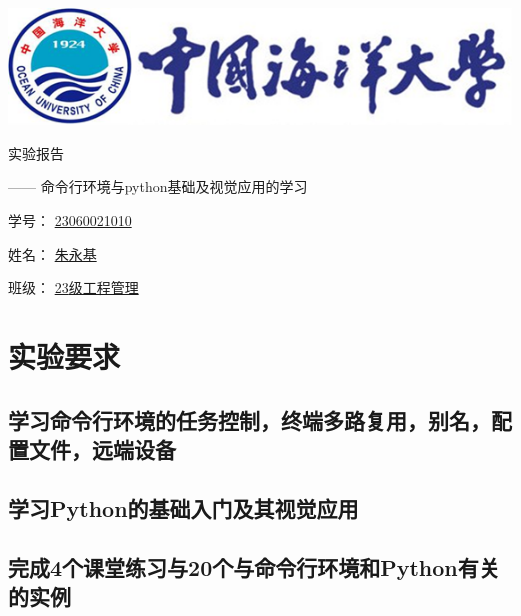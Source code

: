 \documentclass[UTF8,a4paper]{ctexart}
\begin{document}
\begin{sloppypar}


	\begin{center}
	\includegraphics[width = 14cm]{picture/s1}

		\begin{fontsize}{60pt}{20pt}
			实验报告
		\end{fontsize}

		\bigskip
		\bigskip
		
		\begin{fontsize}{20pt}{20pt}
			\begin{flushright}
				—— 命令行环境与{\Huge python}基础及视觉应用的学习
			\end{flushright}
		\end{fontsize}
		
		\bigskip
		\bigskip
		\bigskip
		\bigskip
		\bigskip
		\bigskip
		\bigskip
		\bigskip
		\bigskip
		\bigskip
		\bigskip
		\bigskip
		\bigskip
		\bigskip
		\bigskip
		\bigskip
		
		\begin{fontsize}{25pt}{20pt}

			学号：
			\underline{{\huge 23060021010}}
			\bigskip
			\bigskip
			\bigskip
			\bigskip

			姓名：
			\underline{朱永基}
			\bigskip
			\bigskip
			\bigskip
			\bigskip

			班级：
			\underline{{\Huge 23}级工程管理}
				
		\end{fontsize}
	\end{center}
	\section{实验要求}
	\subsection{学习命令行环境的任务控制，终端多路复用，别名，配置文件，远端设备}
	\subsection{学习Python的基础入门及其视觉应用}
	\subsection{完成4个课堂练习与20个与命令行环境和Python有关的实例}


\end{sloppypar}
\end{document}

